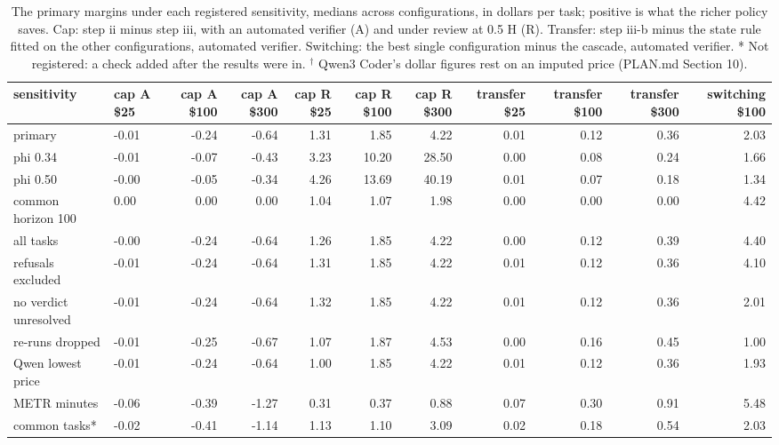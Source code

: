 \begin{table}[t]
\centering
\small
\caption{The primary margins under each registered sensitivity, medians across configurations, in dollars per task; positive is what the richer policy saves. Cap: step ii minus step iii, with an automated verifier (A) and under review at 0.5 H (R). Transfer: step iii-b minus the state rule fitted on the other configurations, automated verifier. Switching: the best single configuration minus the cascade, automated verifier. * Not registered: a check added after the results were in. $^\dagger$ Qwen3 Coder's dollar figures rest on an imputed price (PLAN.md Section 10).}
\label{tab:tableA2_sensitivity_margins}
\begin{tabular}{llrrrrrrrrr}
\toprule
sensitivity & cap A \$25 & cap A \$100 & cap A \$300 & cap R \$25 & cap R \$100 & cap R \$300 & transfer \$25 & transfer \$100 & transfer \$300 & switching \$100 \\
\midrule
primary & -0.01 & -0.24 & -0.64 & 1.31 & 1.85 & 4.22 & 0.01 & 0.12 & 0.36 & 2.03 \\
\midrule
phi 0.34 & -0.01 & -0.07 & -0.43 & 3.23 & 10.20 & 28.50 & 0.00 & 0.08 & 0.24 & 1.66 \\
\midrule
phi 0.50 & -0.00 & -0.05 & -0.34 & 4.26 & 13.69 & 40.19 & 0.01 & 0.07 & 0.18 & 1.34 \\
\midrule
common horizon 100 & 0.00 & 0.00 & 0.00 & 1.04 & 1.07 & 1.98 & 0.00 & 0.00 & 0.00 & 4.42 \\
\midrule
all tasks & -0.00 & -0.24 & -0.64 & 1.26 & 1.85 & 4.22 & 0.00 & 0.12 & 0.39 & 4.40 \\
\midrule
refusals excluded & -0.01 & -0.24 & -0.64 & 1.31 & 1.85 & 4.22 & 0.01 & 0.12 & 0.36 & 4.10 \\
\midrule
no verdict unresolved & -0.01 & -0.24 & -0.64 & 1.32 & 1.85 & 4.22 & 0.01 & 0.12 & 0.36 & 2.01 \\
\midrule
re-runs dropped & -0.01 & -0.25 & -0.67 & 1.07 & 1.87 & 4.53 & 0.00 & 0.16 & 0.45 & 1.00 \\
\midrule
Qwen lowest price & -0.01 & -0.24 & -0.64 & 1.00 & 1.85 & 4.22 & 0.01 & 0.12 & 0.36 & 1.93 \\
\midrule
METR minutes & -0.06 & -0.39 & -1.27 & 0.31 & 0.37 & 0.88 & 0.07 & 0.30 & 0.91 & 5.48 \\
\midrule
common tasks* & -0.02 & -0.41 & -1.14 & 1.13 & 1.10 & 3.09 & 0.02 & 0.18 & 0.54 & 2.03 \\
\bottomrule
\end{tabular}
\end{table}
